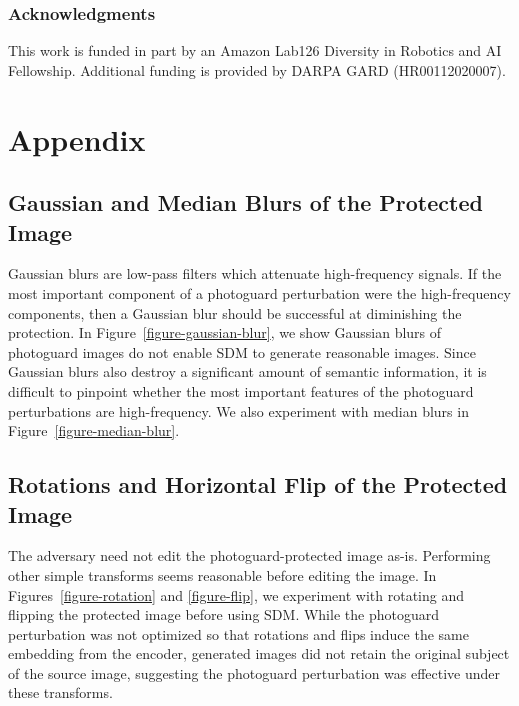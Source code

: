 \documentclass{article} %
\begin{document}
\subsubsection*{Acknowledgments}
This work is funded in part by an Amazon Lab126 Diversity in Robotics and AI Fellowship. Additional funding is provided by DARPA GARD (HR00112020007).  




\appendix
\section{Appendix}

\subsection{Gaussian and Median Blurs of the Protected Image}
\label{apdx:gaussian-median-blurs}

Gaussian blurs are low-pass filters which attenuate high-frequency signals. If the most important component of a photoguard perturbation were the high-frequency components, then a Gaussian blur should be successful at diminishing the protection. In Figure~\ref{figure-gaussian-blur}, we show Gaussian blurs of photoguard images do not enable SDM to generate reasonable images. Since Gaussian blurs also destroy a significant amount of semantic information, it is difficult to pinpoint whether the most important features of the photoguard perturbations are high-frequency. We also experiment with median blurs in Figure~\ref{figure-median-blur}.




\subsection{Rotations and Horizontal Flip of the Protected Image}
\label{apdx:rotations-flip}

The adversary need not edit the photoguard-protected image as-is. Performing other simple transforms seems reasonable before editing the image. In Figures~\ref{figure-rotation} and \ref{figure-flip}, we experiment with rotating and flipping the protected image before using SDM. While the photoguard perturbation was not optimized so that rotations and flips induce the same embedding from the encoder, generated images did not retain the original subject of the source image, suggesting the photoguard perturbation was effective under these transforms.



\end{document}
